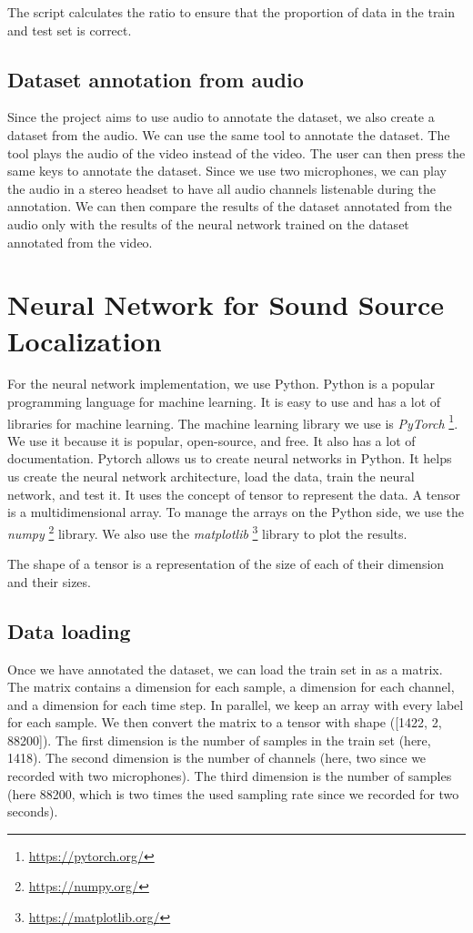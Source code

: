 The script calculates the ratio to ensure that the proportion of data in the train and test set is correct.

\subsection{Dataset annotation from audio}

Since the project aims to use audio to annotate the dataset, we also create a dataset from the audio. We can use the same tool to annotate the dataset. The tool plays the audio of the video instead of the video. The user can then press the same keys to annotate the dataset. Since we use two microphones, we can play the audio in a stereo headset to have all audio channels listenable during the annotation. We can then compare the results of the dataset annotated from the audio only with the results of the neural network trained on the dataset annotated from the video. 

\section{Neural Network for Sound Source Localization}

For the neural network implementation, we use Python. Python is a popular programming language for machine learning. It is easy to use and has a lot of libraries for machine learning. The machine learning library we use is \textit{PyTorch} \footnote{\url{https://pytorch.org/}}. We use it because it is popular, open-source, and free. It also has a lot of documentation. Pytorch allows us to create neural networks in Python. It helps us create the neural network architecture, load the data, train the neural network, and test it. It uses the concept of tensor to represent the data. A tensor is a multidimensional array. To manage the arrays on the Python side, we use the \textit{numpy} \footnote{\url{https://numpy.org/}} library. We also use the \textit{matplotlib} \footnote{\url{https://matplotlib.org/}} library to plot the results. 

The shape of a tensor is a representation of the size of each of their dimension and their sizes.

\subsection{Data loading}
\label{sec:data_loading}

Once we have annotated the dataset, we can load the train set in as a matrix. The matrix contains a dimension for each sample, a dimension for each channel, and a dimension for each time step. In parallel, we keep an array with every label for each sample. We then convert the matrix to a tensor with shape ([1422, 2, 88200]). The first dimension is the number of samples in the train set (here, 1418). The second dimension is the number of channels (here, two since we recorded with two microphones). The third dimension is the number of samples (here 88200, which is two times the used sampling rate since we recorded for two seconds). 

